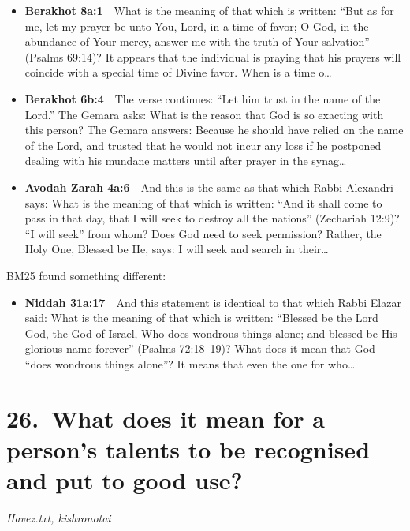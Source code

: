 \documentclass[11pt,a4paper]{article}
\begin{document}
\begin{itemize}[leftmargin=1.2em,itemsep=3pt]
\item {\color{ref}\textbf{Berakhot 8a:1}}\ \ What is the meaning of that which is written: “But as for me, let my prayer be unto You, Lord, in a time of favor; O God, in the abundance of Your mercy, answer me with the truth of Your salvation” (Psalms 69:14)? It appears that the individual is praying that his prayers will coincide with a special time of Divine favor. When is a time o\ldots
\item {\color{ref}\textbf{Berakhot 6b:4}}\ \ The verse continues: “Let him trust in the name of the Lord.” The Gemara asks: What is the reason that God is so exacting with this person? The Gemara answers: Because he should have relied on the name of the Lord, and trusted that he would not incur any loss if he postponed dealing with his mundane matters until after prayer in the synag\ldots
\item {\color{ref}\textbf{Avodah Zarah 4a:6}}\ \ And this is the same as that which Rabbi Alexandri says: What is the meaning of that which is written: “And it shall come to pass in that day, that I will seek to destroy all the nations” (Zechariah 12:9)? “I will seek” from whom? Does God need to seek permission? Rather, the Holy One, Blessed be He, says: I will seek and search in their\ldots
\end{itemize}
{\color{quiet}\small BM25 found something different:}
\begin{itemize}[leftmargin=1.2em]
\item {\color{ref}\textbf{Niddah 31a:17}}\ \ And this statement is identical to that which Rabbi Elazar said: What is the meaning of that which is written: “Blessed be the Lord God, the God of Israel, Who does wondrous things alone; and blessed be His glorious name forever” (Psalms 72:18–19)? What does it mean that God “does wondrous things alone”? It means that even the one for who\ldots
\end{itemize}

\section*{26.\ What does it mean for a person's talents to be recognised and put to good use?}
{\color{quiet}\small\textit{Havez.txt, kishronotai}}
\end{document}
